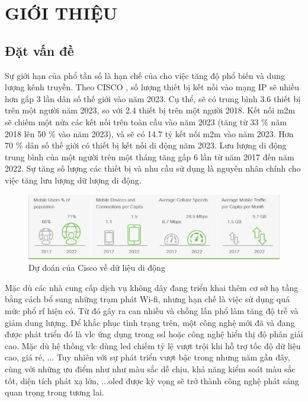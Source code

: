 \chapter{GIỚI THIỆU} \label{sec:chapter_1}
\section{Đặt vấn đề}
Sự giới hạn của phổ tần số là hạn chế của cho việc tăng độ phổ biến và dung lượng kênh truyền. Theo CISCO \cite{cisco}, số lượng thiết bị kết nối vào mạng IP sẽ nhiều hơn gấp 3 lần dân số thế giới vào năm 2023. Cụ thể, sẽ có trung bình 3.6 thiết bị trên một người năm 2023, so với 2.4 thiết bị trên một người 2018. Kết nối \ac{m2m} sẽ chiếm một nửa các kết nối trên toàn cầu vào năm 2023 (tăng từ 33 \% năm 2018 lên 50 \% vào năm 2023), và sẽ có 14.7 tỷ kết nối \ac{m2m} vào năm 2023. Hơn 70 \% dân số thế giới có thiết bị kết nối di động năm 2023. Lưu lượng di động trung bình của một người trên một tháng tăng gấp 6 lần từ năm 2017 đến năm 2022.
Sự tăng số lượng các thiết bị và nhu cầu sử dụng là nguyên nhân chính cho việc tăng lưu lượng dữ lượng di động. 
\begin{figure} [ht]
\centering
\captionsetup{justification=centering}
\includegraphics [scale=0.9] {Image/cisco_forecast}
\caption{Dự đoán của Cisco về dữ liệu di động \cite{cisco_forecast}}
\end{figure}
Mặc dù các nhà cung cấp dịch vụ không dây đang triển khai thêm cơ sở hạ tầng bằng cách bổ sung những trạm phát Wi-fi, nhưng hạn chế là việc sử dụng quá mức phổ \ac{rf} hiện có. Từ đó gây ra can nhiễu và chồng lấn phổ làm tăng độ trễ và giảm dung lượng. Để khắc phục tình trạng trên, một công nghệ mới đã và đang được phát triển đó là \ac{vlc} ứng dụng trong \ac{ssl} hoặc công nghệ hiển thị độ phân giải cao. Mặc dù hệ thống \ac{vlc} dùng \ac{led} chiếm tỷ lệ vượt trội khi hỗ trợ tốc độ dữ liệu cao, giá rẻ, ... Tuy nhiên với sự phát triển vượt bậc trong nhưng năm gần đây, cùng với những ưu điểm như như màu sắc dễ chịu, khả năng kiểm soát màu sắc tốt, diện tích phát xạ lớn, ...\ac{oled} được kỳ vọng sẽ trở thành công nghệ phát sáng quan trọng trong tương lai.

